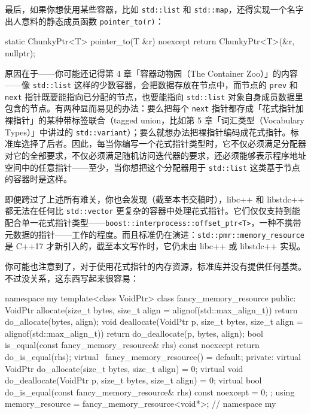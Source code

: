 最后，如果你想使用某些容器，比如 \texttt{std::\allowbreak{}list} 和 \texttt{std::\allowbreak{}map}，还得实现一个名字出人意料的静态成员函数 \texttt{pointer\_\allowbreak{}to(\allowbreak{}r)\allowbreak{}}：

\begin{codebox}[cpp]
    static ChunkyPtr<T> pointer_to(T &r) noexcept {
      return ChunkyPtr<T>(&r, nullptr);
    }
\end{codebox}

原因在于——你可能还记得第 4 章「容器动物园（The Container Zoo）」的内容——像 \texttt{std::\allowbreak{}list} 这样的少数容器，会把数据存放在节点中，而节点的 \texttt{prev} 和 \texttt{next} 指针既要能指向已分配的节点，也要能指向 \texttt{std::\allowbreak{}list} 对象自身成员数据里包含的节点。有两种显而易见的办法：要么把每个 \texttt{next} 指针都存成「花式指针加裸指针」的某种带标签联合（tagged union，比如第 5 章「词汇类型（Vocabulary Types）」中讲过的 \texttt{std::\allowbreak{}variant}）；要么就想办法把裸指针编码成花式指针。标准库选择了后者。因此，每当你编写一个花式指针类型时，它不仅必须满足分配器对它的全部要求，不仅必须满足随机访问迭代器的要求，还必须能够表示程序地址空间中的任意指针——至少，当你想把这个分配器用于 \texttt{std::\allowbreak{}list} 这类基于节点的容器时是这样。

即便跨过了上述所有难关，你也会发现（截至本书交稿时），libc++ 和 libstdc++ 都无法在任何比 \texttt{std::\allowbreak{}vector} 更复杂的容器中处理花式指针。它们仅仅支持到能配合单一花式指针类型——\texttt{boost::\allowbreak{}interprocess::\allowbreak{}offset\_\allowbreak{}ptr<\allowbreak{}T>\allowbreak{}}，一种不携带元数据的指针——工作的程度。而且标准仍在演进：\texttt{std::\allowbreak{}pmr::\allowbreak{}memory\_\allowbreak{}resource} 是 C++17 才新引入的，截至本文写作时，它仍未由 libc++ 或 libstdc++ 实现。

你可能也注意到了，对于使用花式指针的内存资源，标准库并没有提供任何基类。不过没关系，这东西写起来很容易：

\begin{codebox}[cpp]
    namespace my {
      template<class VoidPtr>
      class fancy_memory_resource {
      public:
        VoidPtr allocate(size_t bytes,
          size_t align = alignof(std::max_align_t)) {
          return do_allocate(bytes, align);
        }
        void deallocate(VoidPtr p, size_t bytes,
          size_t align = alignof(std::max_align_t)) {
          return do_deallocate(p, bytes, align);
        }
        bool is_equal(const fancy_memory_resource& rhs) const noexcept {
          return do_is_equal(rhs);
        }
        virtual ~fancy_memory_resource() = default;
      private:
        virtual VoidPtr do_allocate(size_t bytes, size_t align) = 0;
        virtual void do_deallocate(VoidPtr p, size_t bytes,
          size_t align) = 0;
        virtual bool do_is_equal(const fancy_memory_resource& rhs)
          const noexcept = 0;
      };
      using memory_resource = fancy_memory_resource<void*>;
    } // namespace my
\end{codebox}

